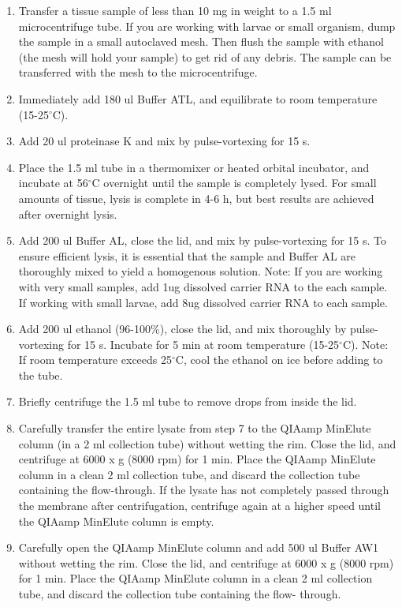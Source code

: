 \documentclass[11pt, oneside]{article}
\begin{document}
		\begin{enumerate}[leftmargin=.5in]
			\item Transfer a tissue sample of less than 10 mg in weight to a 1.5 ml microcentrifuge tube. If you are working with larvae or small organism, 			dump the sample in a small autoclaved mesh. Then flush the sample with ethanol (the mesh will hold your sample) to get rid of any debris. 			The sample can be transferred with the mesh to the microcentrifuge. 
			\item Immediately add 180 ul Buffer ATL, and equilibrate to room temperature
			(15-25$^{\circ}$C).
			\item Add 20 ul proteinase K and mix by pulse-vortexing for 15 s.
			\item Place the 1.5 ml tube in a thermomixer or heated orbital incubator, and incubate at 56$^{\circ}$C overnight until the sample is completely 			lysed. For small amounts of tissue, lysis is complete in 4-6 h, but best results are achieved after overnight lysis.	
			\item Add 200 ul Buffer AL, close the lid, and mix by pulse-vortexing for 15 s. To ensure efficient lysis, it is essential that the sample and Buffer 			AL are thoroughly mixed to yield a homogenous solution. Note: If you are working with very small samples, add 1ug dissolved carrier RNA to 			the each sample. If working with small larvae, add 8ug dissolved carrier RNA to each sample. 
			\item Add 200 ul ethanol (96-100\%), close the lid, and mix thoroughly by pulse-vortexing for 15 s. Incubate for 5 min at room temperature 			(15-25$^{\circ}$C). Note: If room temperature exceeds 25$^{\circ}$C, cool the ethanol on ice before adding to the tube.
			\item Briefly centrifuge the 1.5 ml tube to remove drops from inside the lid.
			\item Carefully transfer the entire lysate from step 7 to the QIAamp MinElute column (in a 2 ml collection tube) without wetting the rim. Close 			the lid, and centrifuge at 6000 x g (8000 rpm) for 1 min. Place the QIAamp MinElute column in a clean 2 ml collection tube, and discard the 			collection tube containing the flow-through. If the lysate has not completely passed through the membrane after centrifugation, centrifuge 				again at a higher speed until the QIAamp MinElute column is empty.
			\item Carefully open the QIAamp MinElute column and add 500 ul Buffer AW1 without wetting the rim. Close the lid, and centrifuge at 6000 x 			g (8000 rpm) for 1 min. Place the QIAamp MinElute column in a clean 2 ml collection tube, and discard the collection tube containing the flow-			through.

\end{enumerate}
\end{document}
